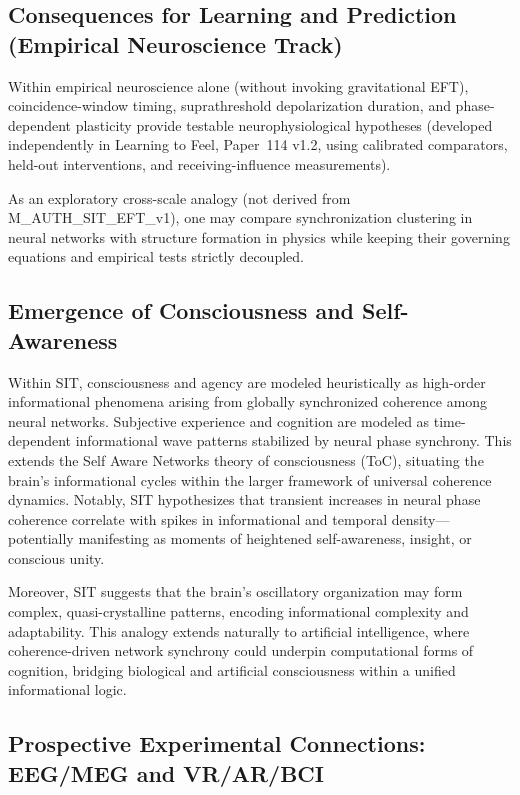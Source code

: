 \documentclass[american,11pt,letterpaper]{article}
\def\texttt#1{#1}%
\def\emph#1{#1}%
\begin{document}
\subsection*{Consequences for Learning and Prediction (Empirical Neuroscience Track)}

Within empirical neuroscience alone (without invoking gravitational EFT), coincidence-window timing, suprathreshold depolarization duration, and phase-dependent plasticity provide testable neurophysiological hypotheses (developed independently in \emph{Learning to Feel}, Paper~114 v1.2, using calibrated comparators, held-out interventions, and receiving-influence measurements).

As an exploratory cross-scale analogy (not derived from \texttt{M\_AUTH\_SIT\_EFT\_v1}), one may compare synchronization clustering in neural networks with structure formation in physics while keeping their governing equations and empirical tests strictly decoupled.

\subsection{Emergence of Consciousness and Self-Awareness}

Within SIT, consciousness and agency are modeled heuristically as high-order informational phenomena arising from globally synchronized coherence among neural networks. Subjective experience and cognition are modeled as time-dependent informational wave patterns stabilized by neural phase synchrony. This extends the Self Aware Networks theory of consciousness (ToC), situating the brain's informational cycles within the larger framework of universal coherence dynamics. Notably, SIT hypothesizes that transient increases in neural phase coherence correlate with spikes in informational and temporal density---potentially manifesting as moments of heightened self-awareness, insight, or conscious unity.

Moreover, SIT suggests that the brain's oscillatory organization may form complex, quasi-crystalline patterns, encoding informational complexity and adaptability. This analogy extends naturally to artificial intelligence, where coherence-driven network synchrony could underpin computational forms of cognition, bridging biological and artificial consciousness within a unified informational logic.

\subsection{Prospective Experimental Connections: EEG/MEG and VR/AR/BCI}
\end{document}

